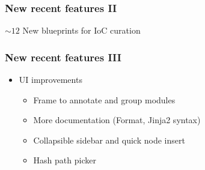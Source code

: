\begin{frame}
    \frametitle{New recent features II}
    $\sim 12$ New blueprints for IoC curation
\end{frame}

\begin{frame}
    \frametitle{New recent features III}
    \begin{itemize}
        \item UI improvements
        \begin{itemize}
            \item Frame to annotate and group modules
            \item More documentation (Format, Jinja2 syntax)
            \item Collapsible sidebar and quick node insert
            \item Hash path picker
        \end{itemize}
    \end{itemize}
    \begin{center}
    \end{center}
\end{frame}

